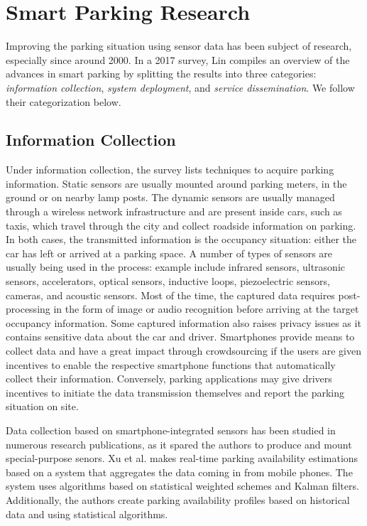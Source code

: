 	\section{Smart Parking Research}
	\label{sec:spresearch}
	Improving the parking situation using sensor data has been subject of research, especially since around 2000. In a 2017 survey\cite{lin,lin2}, Lin compiles an overview of the advances in smart parking by splitting the results into three categories: \textit{information collection}, \textit{system deployment}, and \textit{service dissemination}. We follow their categorization below.
	
	\subsection{Information Collection}
	Under information collection, the survey lists techniques to acquire parking information. Static sensors are usually mounted around parking meters, in the ground or on nearby lamp posts. The dynamic sensors are usually managed through a wireless network infrastructure and are present inside cars, such as taxis, which travel through the city and collect roadside information on parking. In both cases, the transmitted information is the occupancy situation: either the car has left or arrived at a parking space. A number of types of sensors are usually being used in the process: example include infrared sensors, ultrasonic sensors, accelerators, optical sensors, inductive loops, piezoelectric sensors, cameras, and acoustic sensors. Most of the time, the captured data requires post-processing in the form of image or audio recognition before arriving at the target occupancy information. Some captured information also raises privacy issues as it contains sensitive data about the car and driver. Smartphones provide means to collect data and have a great impact through crowdsourcing if the users are given incentives to enable the respective smartphone functions that automatically collect their information. Conversely, parking applications may give drivers incentives to initiate the data transmission themselves and report the parking situation on site. 
	
	Data collection based on smartphone-integrated sensors has been studied in numerous research publications, as it spared the authors to produce and mount special-purpose senors. Xu et al.\cite{xu} makes real-time parking availability estimations based on a system that aggregates the data coming in from mobile phones. The system uses algorithms based on statistical weighted schemes and Kalman filters. Additionally, the authors create parking availability profiles based on historical data and using statistical algorithms. 
	
